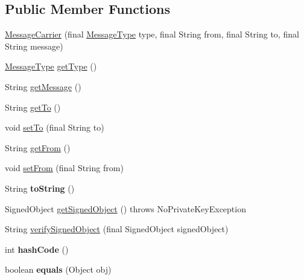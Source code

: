 \subsection*{Public Member Functions}
\begin{DoxyCompactItemize}
\item 
\hyperlink{classgov_1_1fnal_1_1ppd_1_1dd_1_1chat_1_1xml_1_1MessageCarrier_aee2870e1a11b57fd2e4cd907f25f1321}{Message\-Carrier} (final \hyperlink{enumgov_1_1fnal_1_1ppd_1_1dd_1_1chat_1_1MessageType}{Message\-Type} type, final String from, final String to, final String message)
\item 
\hyperlink{enumgov_1_1fnal_1_1ppd_1_1dd_1_1chat_1_1MessageType}{Message\-Type} \hyperlink{classgov_1_1fnal_1_1ppd_1_1dd_1_1chat_1_1xml_1_1MessageCarrier_a6357b5701d014172f04932ac4e0016de}{get\-Type} ()
\item 
String \hyperlink{classgov_1_1fnal_1_1ppd_1_1dd_1_1chat_1_1xml_1_1MessageCarrier_ae7d5b1fc6e5681ef92c13cb937d5f524}{get\-Message} ()
\item 
String \hyperlink{classgov_1_1fnal_1_1ppd_1_1dd_1_1chat_1_1xml_1_1MessageCarrier_afee4cd43d9a626364fff7e4f35b92be3}{get\-To} ()
\item 
void \hyperlink{classgov_1_1fnal_1_1ppd_1_1dd_1_1chat_1_1xml_1_1MessageCarrier_aefd79d54294f4acba27531135ba342ed}{set\-To} (final String to)
\item 
String \hyperlink{classgov_1_1fnal_1_1ppd_1_1dd_1_1chat_1_1xml_1_1MessageCarrier_a3f8a8144b325758cd02a2ea0ee89942a}{get\-From} ()
\item 
void \hyperlink{classgov_1_1fnal_1_1ppd_1_1dd_1_1chat_1_1xml_1_1MessageCarrier_a3581966239b8761c77f122741e65086b}{set\-From} (final String from)
\item 
\hypertarget{classgov_1_1fnal_1_1ppd_1_1dd_1_1chat_1_1xml_1_1MessageCarrier_a08062b0a41f4f5556cec5357a2717df9}{String {\bfseries to\-String} ()}\label{classgov_1_1fnal_1_1ppd_1_1dd_1_1chat_1_1xml_1_1MessageCarrier_a08062b0a41f4f5556cec5357a2717df9}

\item 
Signed\-Object \hyperlink{classgov_1_1fnal_1_1ppd_1_1dd_1_1chat_1_1xml_1_1MessageCarrier_ac48ab073bdf4884cbf51e066d4e9a66f}{get\-Signed\-Object} ()  throws No\-Private\-Key\-Exception 
\item 
String \hyperlink{classgov_1_1fnal_1_1ppd_1_1dd_1_1chat_1_1xml_1_1MessageCarrier_a6295c831b310948a1bf4232c96767171}{verify\-Signed\-Object} (final Signed\-Object signed\-Object)
\item 
\hypertarget{classgov_1_1fnal_1_1ppd_1_1dd_1_1chat_1_1xml_1_1MessageCarrier_a0ebbeb1fe5706ce366d400d23b3352c1}{int {\bfseries hash\-Code} ()}\label{classgov_1_1fnal_1_1ppd_1_1dd_1_1chat_1_1xml_1_1MessageCarrier_a0ebbeb1fe5706ce366d400d23b3352c1}

\item 
\hypertarget{classgov_1_1fnal_1_1ppd_1_1dd_1_1chat_1_1xml_1_1MessageCarrier_a6aa03e48ef98b1e542d360942b5005ac}{boolean {\bfseries equals} (Object obj)}\label{classgov_1_1fnal_1_1ppd_1_1dd_1_1chat_1_1xml_1_1MessageCarrier_a6aa03e48ef98b1e542d360942b5005ac}

\end{DoxyCompactItemize}
